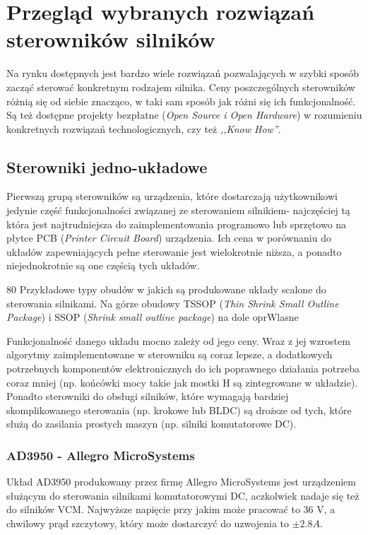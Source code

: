 \section{Przegląd wybranych rozwiązań sterowników silników}
\label{s:sterowniki} 

Na rynku dostępnych jest bardzo wiele rozwiązań pozwalających w szybki sposób zacząć sterować konkretnym rodzajem silnika. Ceny poszczególnych sterowników różnią się od siebie znacząco, w taki sam sposób jak różni się ich funkcjonalność. Są też dostępne projekty bezpłatne ({\it Open Source i Open Hardware}) w rozumieniu konkretnych rozwiązań technologicznych, czy też {\it ,,Know How''}.

\subsection{Sterowniki jedno-układowe}

Pierwszą grupą sterowników są urządzenia, które dostarczają użytkownikowi jedynie część funkcjonalności związanej ze sterowaniem silnikiem- najczęściej tą która jest najtrudniejsza do zaimplementowania programowo lub sprzętowo na płytce PCB ({\it Printer Circuit Board}) urządzenia. Ich cena w porównaniu do układów zapewniających pełne sterowanie jest wielokrotnie niższa, a ponadto niejednokrotnie są one częścią tych układów. 

	{80}
	{Przykładowe typy obudów w jakich są produkowane układy scalone do sterowania silnikami. Na górze obudowy TSSOP ({\it Thin Shrink Small Outline Package}) i SSOP ({\it Shrink small outline package}) na dole}
	{oprWlasne}

Funkcjonalność danego układu mocno zależy od jego ceny. Wraz z jej wzrostem algorytmy zaimplementowane w sterowniku są coraz lepsze, a dodatkowych potrzebnych komponentów elektronicznych do ich poprawnego działania potrzeba coraz mniej (np. końcówki mocy takie jak mostki H są zintegrowane w układzie). Ponadto sterowniki do obsługi silników, które wymagają bardziej skomplikowanego sterowania (np. krokowe lub BLDC) są droższe od tych, które służą do zasilania prostych maszyn (np. silniki komutatorowe DC). 

\subsubsection{AD3950 - Allegro MicroSystems}
\label{ss:allegro}

Układ AD3950 produkowany przez firmę Allegro MicroSystems jest urządzeniem służącym do sterowania silnikami komutatorowymi DC, aczkolwiek nadaje się też do silników VCM. Najwyższe napięcie przy jakim może pracować to 36 V, a chwilowy prąd szczytowy, który może dostarczyć do uzwojenia to $ \pm2.8 A $.

